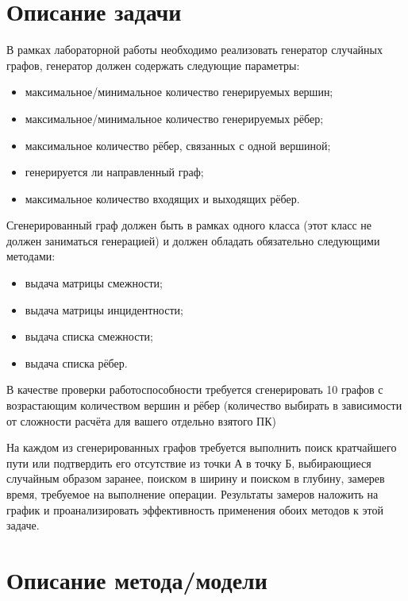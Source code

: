 \documentclass[12pt, a4paper]{report}
\begin{document}
	\section*{Описание задачи}
	\large
	В рамках лабораторной работы необходимо реализовать генератор случайных графов, генератор должен содержать следующие параметры:
	\begin{itemize}
		\item максимальное/минимальное количество генерируемых вершин;
		\item максимальное/минимальное количество генерируемых рёбер;
		\item максимальное количество рёбер, связанных с одной вершиной;
		\item генерируется ли направленный граф;
		\item максимальное количество входящих и выходящих рёбер.
	\end{itemize}
	\par
	Сгенерированный граф должен быть в рамках одного класса (этот класс не должен заниматься генерацией) и должен обладать обязательно следующими методами:
	\begin{itemize}
		\item выдача матрицы смежности;
		\item выдача матрицы инцидентности;
		\item выдача списка смежности;
		\item выдача списка рёбер.
	\end{itemize}
	\par
	В качестве проверки работоспособности требуется сгенерировать 10 графов с возрастающим количеством вершин и рёбер (количество выбирать в зависимости от сложности расчёта для вашего отдельно взятого ПК)
	\par
	На каждом из сгенерированных графов требуется выполнить поиск кратчайшего пути или подтвердить его отсутствие из точки А в точку Б, выбирающиеся случайным образом заранее, поиском в ширину и поиском в глубину, замерев время, требуемое на выполнение операции. Результаты замеров наложить на график и проанализировать эффективность применения обоих методов к этой задаче.
	
	\newpage

	\section*{Описание метода/модели}
	\large
\end{document}
